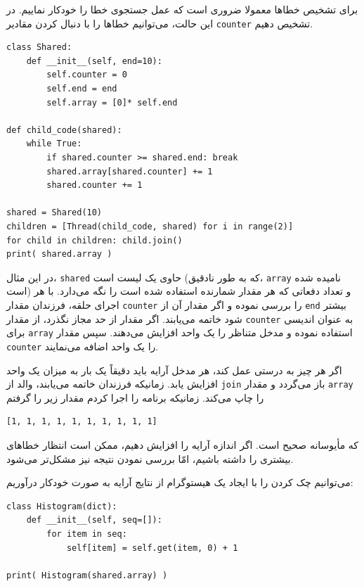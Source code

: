 \documentclass{book}
\begin{document}
    برای تشخیص خطاها معمولا ضروری است که عمل جستجوی خطا را خودکار نماییم. 
    در این حالت، می‌توانیم خطاها را با دنبال کردن مقادیر  {\tt counter} تشخیص دهیم. 

\begin{latin}
\begin{lstlisting}
class Shared:
    def __init__(self, end=10):
        self.counter = 0
        self.end = end
        self.array = [0]* self.end

def child_code(shared):
    while True:
        if shared.counter >= shared.end: break
        shared.array[shared.counter] += 1
        shared.counter += 1

shared = Shared(10)
children = [Thread(child_code, shared) for i in range(2)]
for child in children: child.join()
print( shared.array )
\end{lstlisting}
\end{latin}

    در این مثال، {\tt shared} حاوی یک لیست است (که به طور نادقیق، {\tt array} نامیده شده است)  و  تعداد دفعاتی که هر مقدار شمارنده استفاده شده است را 
    نگه می‌دارد. 
    با هر اجرای حلقه، فرزندان مقدار {\tt counter} را بررسی نموده و اگر مقدار آن از {\tt end} بیشتر شود خاتمه می‌یابند. 
    اگر مقدار از حد مجاز نگذرد، از مقدار {\tt counter} به عنوان اندیسی برای {\tt array} استفاده نموده و مدخل متناظر را یک واحد افزایش می‌دهند. 
    سپس مقدار {\tt counter}  را یک واحد اضافه می‌نمایند. 

    اگر هر چیز به درستی عمل کند، هر مدخل آرایه باید دقیقاً یک بار به میزان یک واحد افزایش یابد. 
    زمانیکه فرزندان خاتمه می‌یابند، والد  از {\tt join} باز می‌گردد و مقدار  {\tt array} را چاپ می‌کند. 
    زمانیکه برنامه را اجرا کردم مقدار زیر را گرفتم    
%
\begin{verbatim}
[1, 1, 1, 1, 1, 1, 1, 1, 1, 1]
\end{verbatim}

    که مأیوسانه صحیح است. اگر اندازه آرایه را افزایش دهیم، ممکن است انتظار خطاهای بیشتری را داشته باشیم، امّا بررسی نمودن نتیجه نیز مشکل‌تر می‌شود. 

\newpage
    می‌توانیم چک کردن را با ایجاد یک هیستوگرام از نتایج آرایه به صورت خودکار درآوریم: 

\begin{latin}
\begin{lstlisting}
class Histogram(dict):
    def __init__(self, seq=[]):
        for item in seq:
            self[item] = self.get(item, 0) + 1

print( Histogram(shared.array) )
\end{lstlisting}
\end{latin}
\end{document}
